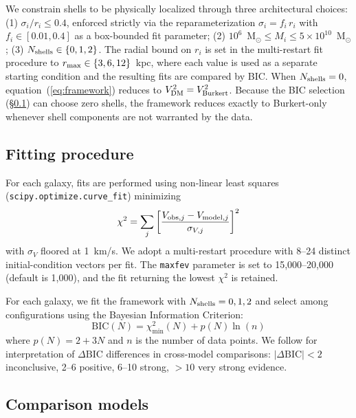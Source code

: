 We constrain shells to be physically localized through three architectural choices: (1) $\sigma_i / r_i \leq 0.4$, enforced strictly via the reparameterization $\sigma_i = f_i \, r_i$ with $f_i \in [0.01, 0.4]$ as a box-bounded fit parameter; (2) $10^6$~M$_\odot \leq M_i \leq 5 \times 10^{10}$~M$_\odot$; (3) $N_{\rm shells} \in \{0, 1, 2\}$. The radial bound on $r_i$ is set in the multi-restart fit procedure to $r_{\rm max} \in \{3, 6, 12\}$~kpc, where each value is used as a separate starting condition and the resulting fits are compared by BIC. When $N_{\rm shells} = 0$, equation~(\ref{eq:framework}) reduces to $V^2_{\rm DM} = V^2_{\rm Burkert}$. Because the BIC selection (\S\ref{sec:fitting}) can choose zero shells, the framework reduces exactly to Burkert-only whenever shell components are not warranted by the data.

\subsection{Fitting procedure}
\label{sec:fitting}

For each galaxy, fits are performed using non-linear least squares (\texttt{scipy.optimize.curve\_fit}) minimizing
\begin{equation}
\chi^2 = \sum_j \left[\frac{V_{{\rm obs},j} - V_{{\rm model},j}}{\sigma_{V,j}}\right]^2
\end{equation}
with $\sigma_V$ floored at 1~km/s. We adopt a multi-restart procedure with 8--24 distinct initial-condition vectors per fit. The \texttt{maxfev} parameter is set to 15{,}000--20{,}000 (default is 1{,}000), and the fit returning the lowest $\chi^2$ is retained.

For each galaxy, we fit the framework with $N_{\rm shells} = 0, 1, 2$ and select among configurations using the Bayesian Information Criterion:
\begin{equation}
\mathrm{BIC}(N) = \chi^2_{\min}(N) + p(N) \ln(n)
\end{equation}
where $p(N) = 2 + 3N$ and $n$ is the number of data points. We follow \citet{KassRaftery1995} for interpretation of $\Delta\mathrm{BIC}$ differences in cross-model comparisons: $|\Delta\mathrm{BIC}| < 2$ inconclusive, 2--6 positive, 6--10 strong, $>10$ very strong evidence.

\subsection{Comparison models}
\label{sec:comparison}

